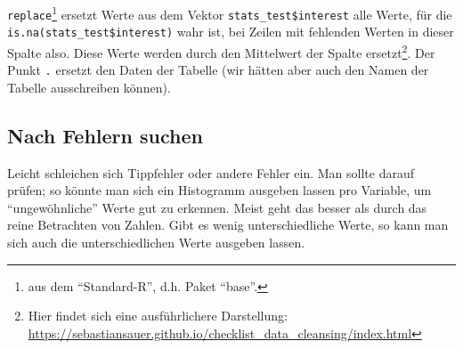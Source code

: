 \documentclass[12pt,ngerman,]{book}
\makeatletter
\newenvironment{Shaded}{\begin{snugshade}}{\end{snugshade}}
\newcommand{\KeywordTok}[1]{\textcolor[rgb]{0.13,0.29,0.53}{\textbf{#1}}}
\newcommand{\DataTypeTok}[1]{\textcolor[rgb]{0.13,0.29,0.53}{#1}}
\newcommand{\StringTok}[1]{\textcolor[rgb]{0.31,0.60,0.02}{#1}}
\newcommand{\CommentTok}[1]{\textcolor[rgb]{0.56,0.35,0.01}{\textit{#1}}}
\newcommand{\OtherTok}[1]{\textcolor[rgb]{0.56,0.35,0.01}{#1}}
\newcommand{\OperatorTok}[1]{\textcolor[rgb]{0.81,0.36,0.00}{\textbf{#1}}}
\newcommand{\NormalTok}[1]{#1}
\let\rmarkdownfootnote\footnote%
\def\footnote{\protect\rmarkdownfootnote}
\newenvironment{kframe}{%
\medskip{}
\setlength{\fboxsep}{.8em}
 \def\at@end@of@kframe{}%
 \ifinner\ifhmode%
  \def\at@end@of@kframe{\end{minipage}}%
  \begin{minipage}{\columnwidth}%
 \fi\fi%
 \def\FrameCommand##1{\hskip\@totalleftmargin \hskip-\fboxsep
 \colorbox{shadecolor}{##1}\hskip-\fboxsep
     \hskip-\linewidth \hskip-\@totalleftmargin \hskip\columnwidth}%
 \MakeFramed {\advance\hsize-\width
   \@totalleftmargin\z@ \linewidth\hsize
   \@setminipage}}%
 {\par\unskip\endMakeFramed%
 \at@end@of@kframe}
\renewenvironment{Shaded}{\begin{kframe}}{\end{kframe}}
\theoremstyle{definition}
\theoremstyle{definition}
\theoremstyle{remark}
\makeatother
\begin{document}
\begin{Shaded}
\end{Shaded}

\texttt{replace}\footnote{aus dem ``Standard-R'', d.h. Paket ``base''.}
ersetzt Werte aus dem Vektor \texttt{stats\_test\$interest} alle Werte,
für die \texttt{is.na(stats\_test\$interest)} wahr ist, bei Zeilen mit
fehlenden Werten in dieser Spalte also. Diese Werte werden durch den
Mittelwert der Spalte ersetzt\footnote{Hier findet sich eine
  ausführlichere Darstellung:
  \url{https://sebastiansauer.github.io/checklist_data_cleansing/index.html}}.
Der Punkt \texttt{.} ersetzt den Daten der Tabelle (wir hätten aber auch
den Namen der Tabelle ausschreiben können).

\subsection{Nach Fehlern suchen}\label{nach-fehlern-suchen}

Leicht schleichen sich Tippfehler oder andere Fehler ein. Man sollte
darauf prüfen; so könnte man sich ein Histogramm ausgeben lassen pro
Variable, um ``ungewöhnliche'' Werte gut zu erkennen. Meist geht das
besser als durch das reine Betrachten von Zahlen. Gibt es wenig
unterschiedliche Werte, so kann man sich auch die unterschiedlichen
Werte ausgeben lassen.

\begin{Shaded}
\end{Shaded}
\end{document}
